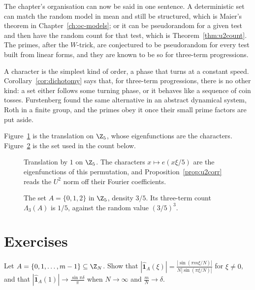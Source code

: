 The chapter's organisation can now be said in one sentence. A deterministic set can match the random model in mean and still be structured, which is Maier's theorem in Chapter~\ref{ch:oc-models}; or it can be pseudorandom for a given test and then have the random count for that test, which is Theorem~\ref{thm:u2count}. The primes, after the $W$-trick, are conjectured to be pseudorandom for every test built from linear forms, and they are known to be so for three-term progressions.

\begin{beauty}
A character is the simplest kind of order, a phase that turns at a constant speed. Corollary~\ref{cor:dichotomy} says that, for three-term progressions, there is no other kind: a set either follows some turning phase, or it behaves like a sequence of coin tosses. Furstenberg found the same alternative in an abstract dynamical system, Roth in a finite group, and the primes obey it once their small prime factors are put aside.
\end{beauty}

Figure~\ref{fig:v15c12-cycle} is the translation on \(\Z_5\), whose eigenfunctions are the characters. Figure~\ref{fig:v15c12-progression} is the set used in the count below.

\begin{figure}[ht]
\centering
{}
\caption{Translation by \(1\) on \(\Z_5\). The characters \(x\mapsto e(x\xi/5)\) are the eigenfunctions of this permutation, and Proposition~\ref{prop:u2corr} reads the \(U^2\) norm off their Fourier coefficients.}
\label{fig:v15c12-cycle}
\end{figure}

\begin{figure}[ht]
\centering
{}
\caption{The set \(A=\{0,1,2\}\) in \(\Z_5\), density \(3/5\). Its three-term count \(\Lambda_3(A)\) is \(1/5\), against the random value \((3/5)^3\).}
\label{fig:v15c12-progression}
\end{figure}

\section{Exercises}

\begin{exercise}[$\star$]\label{ex:intervalcoef}
Let $A=\{0,1,\dots,m-1\}\subseteq\Z_N$. Show that $|\hat{\mathbf 1}_A(\xi)|=\frac{|\sin(\pi m\xi/N)|}{N|\sin(\pi\xi/N)|}$ for $\xi\ne0$, and that $|\hat{\mathbf 1}_A(1)|\to\frac{\sin\pi\delta}\pi$ when $N\to\infty$ and $\frac mN\to\delta$.
\end{exercise}

